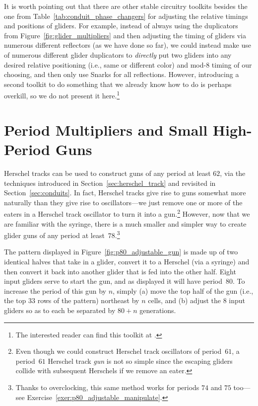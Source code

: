 It is worth pointing out that there are other stable circuitry toolkits besides the one from Table~\ref{tab:conduit_phase_changers} for adjusting the relative timings and positions of gliders. For example, instead of always using the duplicators from Figure~\ref{fig:glider_multipliers} and then adjusting the timing of gliders via numerous different reflectors (as we have done so far), we could instead make use of numerous different glider duplicators to \emph{directly} put two gliders into any desired relative positioning (i.e., same or different color) and mod-$8$ timing of our choosing, and then only use Snarks for all reflections. However, introducing a second toolkit to do something that we already know how to do is perhaps overkill, so we do not present it here.\footnote{The interested reader can find this toolkit at .}



\section{Period Multipliers and Small High-Period Guns}\label{sec:large_glider_guns}

Herschel tracks can be used to construct guns of any period at least $62$, via the techniques introduced in Section~\ref{sec:herschel_track} and revisited in Section~\ref{sec:conduits}. In fact, Herschel tracks give rise to guns somewhat more naturally than they give rise to oscillators---we just remove one or more of the eaters in a Herschel track oscillator to turn it into a gun.\footnote{Even though we could construct Herschel track oscillators of period~$61$, a period~$61$ Herschel track \emph{gun} is not so simple since the escaping gliders collide with subsequent Herschels if we remove an eater.} However, now that we are familiar with the syringe, there is a much smaller and simpler way to create glider guns of any period at least~$78$.\footnote{Thanks to overclocking, this same method works for periods $74$ and $75$ too---see Exercise~\ref{exer:p80_adjustable_manipulate}.}

The pattern displayed in Figure~\ref{fig:p80_adjustable_gun} is made up of two identical halves that take in a glider, convert it to a Herschel (via a syringe) and then convert it back into another glider that is fed into the other half. Eight input gliders serve to start the gun, and as displayed it will have period~$80$. To increase the period of this gun by $n$, simply (a) move the top half of the gun (i.e., the top $33$ rows of the pattern) northeast by $n$ cells, and (b) adjust the $8$ input gliders so as to each be separated by $80+n$ generations.

